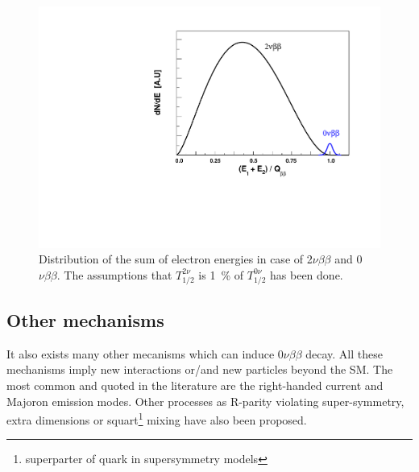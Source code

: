 \documentclass[main.tex]{subfiles}
\begin{document}
\begin{figure}[h!]
\begin{center}
\includegraphics[scale=0.55]{pictures/Chap2/BetaDecaySpectrum.pdf}
\caption{Distribution of the sum of electron energies in case of 2$\nu\beta\beta$ and 0$\nu\beta\beta$. The assumptions that $T_{\text{1/2}}^{\text{2}\nu}$ is 1~\% of $T_{\text{1/2}}^{\text{0}\nu}$ has been done.}
\label{EnergySpectrumDBD}
\end{center}
\end{figure}


\FloatBarrier

\subsection{Other mechanisms}\label{sec:OtherMechanisms}


\NI It also exists many other mecanisms which can induce 0$\nu\beta\beta$ decay. All these mechanisms imply new interactions or/and new particles beyond the SM.  The most common and quoted in the literature are the right-handed current and Majoron emission modes. Other processes as R-parity violating super-symmetry, extra dimensions or squart\footnote{superparter of quark in supersymmetry models} mixing have also been proposed.


\end{document}
